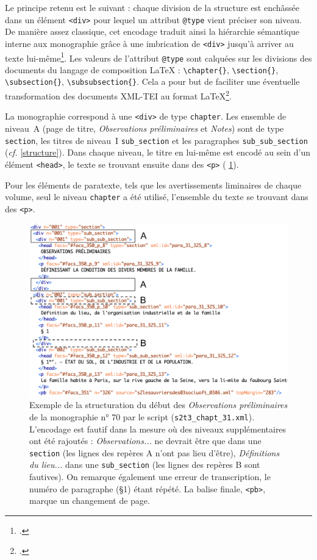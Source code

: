 Le principe retenu est le suivant : chaque division de la structure est enchâssée dans un élément \texttt{<div>} pour lequel un attribut \texttt{@type} vient préciser son niveau. De manière assez classique, cet encodage traduit ainsi la hiérarchie sémantique interne aux monographie grâce à une imbrication de \texttt{<div>} jusqu'à arriver au texte lui-même\footcite[p. 117]{clerice}. Les valeurs de l'attribut \texttt{@type} sont calquées sur les divisions des documents du langage de composition \LaTeX{} : \texttt{\textbackslash chapter\{\}}, \texttt{\textbackslash section\{\}}, \texttt{\textbackslash subsection\{\}}, \texttt{\textbackslash subsubsection\{\}}. Cela a pour but de faciliter une éventuelle transformation des documents XML-TEI au format \LaTeX\footcite[p. 52]{chague2}.

La monographie correspond à une \texttt{<div>} de type \texttt{chapter}. Les ensemble de niveau~A (page de titre, \textit{Observations préliminaires} et \textit{Notes}) sont de type \texttt{section}, les titres de niveau~I \texttt{sub\_section} et les paragraphes \texttt{sub\_sub\_section} (\textit{cf.} \ann{} \ref{structure}). Dans chaque niveau, le titre en lui-même est encodé au sein d'un élément \texttt{<head>}, le texte se trouvant ensuite dans des \texttt{<p>} (\fig{} \ref{fig:ex_structure}).

Pour les éléments de paratexte, tels que les avertissements liminaires de chaque volume, seul le niveau \texttt{chapter} a été utilisé, l'ensemble du texte se trouvant dans des \texttt{<p>}.

\begin{figure}[t]
    \centering
    \includegraphics[width=16cm]{img/ex_structure.png}
    \caption[Exemple de la structuration du début de la monographie n° 70]{Exemple de la structuration du début des \textit{Observations préliminaires} de la monographie n° 70 par le script \lse{} (\texttt{s2t3\_chapt\_31.xml}). L'encodage est fautif dans la mesure où des niveaux supplémentaires ont été rajoutés : \textit{Observations...} ne devrait être que dans une \texttt{section} (les lignes des repères A n'ont pas lieu d'être), \textit{Définitions du lieu...} dans une \texttt{sub\_section} (les lignes des repères B sont fautives). On remarque également une erreur de transcription, le numéro de paragraphe (§1) étant répété. La balise finale, \texttt{<pb>}, marque un changement de page.}
    \label{fig:ex_structure}
\end{figure}


